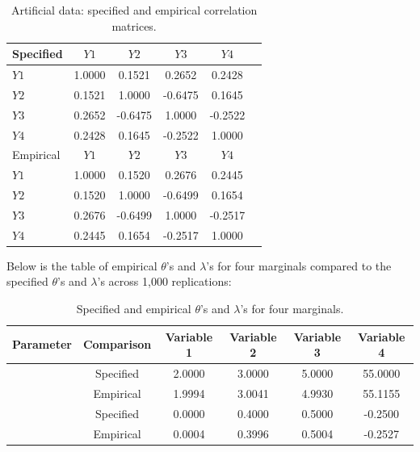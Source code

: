 \begin{table}[H]
\caption{Artificial data: specified and empirical correlation matrices.}
\centering 
\begin{tabular}{lccccc} 
\toprule
Specified  & $Y1$ & $Y2$ & $Y3$ & $Y4$
\\ [0.5ex]
\midrule
$Y1$ & 1.0000 & 0.1521 & 0.2652 & 0.2428 \\ 

$Y2$ & 0.1521 & 1.0000 & -0.6475 & 0.1645 \\

$Y3$ & 0.2652 & -0.6475 & 1.0000 & -0.2522 \\

$Y4$ & 0.2428 & 0.1645 & -0.2522 & 1.0000 \\

\midrule
Empirical & $Y1$ & $Y2$ & $Y3$ & $Y4$ \\ [0.5ex]
\midrule
$Y1$ & 1.0000 & 0.1520 & 0.2676 & 0.2445 \\

$Y2$ & 0.1520 & 1.0000 & -0.6499 & 0.1654 \\

$Y3$ & 0.2676 & -0.6499 & 1.0000 & -0.2517 \\

$Y4$ & 0.2445 & 0.1654 & -0.2517 & 1.0000 \\
[0.5ex]
\bottomrule
\end{tabular}
\end{table}

Below is the table of empirical $\theta$'s and $\lambda$'s for four marginals compared to the specified $\theta$'s and $\lambda$'s across 1,000 replications:

\begin{table}[ht]
\caption{Specified and empirical $\theta$'s and $\lambda$'s for four marginals.} 
\centering 
\begin{tabularx}{0.6\paperwidth}{lccccc}
\toprule
Parameter & Comparison & Variable 1 & Variable 2 & Variable 3 & Variable 4 \\ [0.5ex] 
\midrule
& Specified & 2.0000 & 3.0000 & 5.0000 & 55.0000 \\ [-1ex]
\raisebox{1.5ex}{Rate ($\theta$)} 
& Empirical & 1.9994 & 3.0041 & 4.9930 & 55.1155 \\
\midrule
& Specified & 0.0000 & 0.4000 & 0.5000 & -0.2500 \\ [-1ex]
\raisebox{1.5ex}{Dispersion ($\lambda$)} 
& Empirical & 0.0004 & 0.3996 & 0.5004 & -0.2527 \\
\bottomrule
\end{tabularx}
\label{t-3} 
\end{table}

